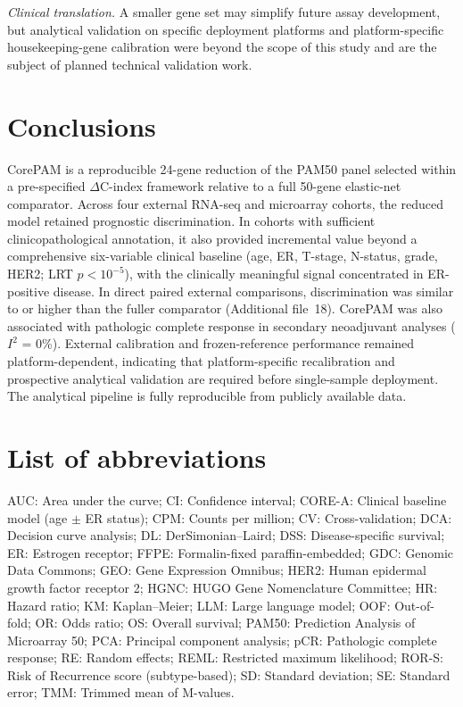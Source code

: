 \documentclass[referee,lineno,pdflatex,sn-vancouver-num]{sn-jnl}
\begin{document}
\textit{Clinical translation.} A smaller gene set may simplify future assay development, but analytical validation on specific deployment platforms and platform-specific housekeeping-gene calibration were beyond the scope of this study and are the subject of planned technical validation work.

\section{Conclusions}\label{sec:conclusions}

CorePAM is a reproducible 24-gene reduction of the PAM50 panel selected within a pre-specified $\Delta$C-index framework relative to a full 50-gene elastic-net comparator. Across four external RNA-seq and microarray cohorts, the reduced model retained prognostic discrimination. In cohorts with sufficient clinicopathological annotation, it also provided incremental value beyond a comprehensive six-variable clinical baseline (age, ER, T-stage, N-status, grade, HER2; LRT $p < 10^{-5}$), with the clinically meaningful signal concentrated in ER-positive disease. In direct paired external comparisons, discrimination was similar to or higher than the fuller comparator (Additional file~18). CorePAM was also associated with pathologic complete response in secondary neoadjuvant analyses ($I^2$ = 0\%). External calibration and frozen-reference performance remained platform-dependent, indicating that platform-specific recalibration and prospective analytical validation are required before single-sample deployment. The analytical pipeline is fully reproducible from publicly available data.

\backmatter

\section*{List of abbreviations}

\noindent
AUC: Area under the curve;
CI: Confidence interval;
CORE-A: Clinical baseline model (age $\pm$ ER status);
CPM: Counts per million;
CV: Cross-validation;
DCA: Decision curve analysis;
DL: DerSimonian--Laird;
DSS: Disease-specific survival;
ER: Estrogen receptor;
FFPE: Formalin-fixed paraffin-embedded;
GDC: Genomic Data Commons;
GEO: Gene Expression Omnibus;
HER2: Human epidermal growth factor receptor 2;
HGNC: HUGO Gene Nomenclature Committee;
HR: Hazard ratio;
KM: Kaplan--Meier;
LLM: Large language model;
OOF: Out-of-fold;
OR: Odds ratio;
OS: Overall survival;
PAM50: Prediction Analysis of Microarray 50;
PCA: Principal component analysis;
pCR: Pathologic complete response;
RE: Random effects;
REML: Restricted maximum likelihood;
ROR-S: Risk of Recurrence score (subtype-based);
SD: Standard deviation;
SE: Standard error;
TMM: Trimmed mean of M-values.
\end{document}
